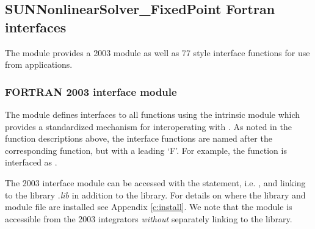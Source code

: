 \subsection{SUNNonlinearSolver\_FixedPoint Fortran interfaces}
\label{ss:sunnonlinsolfixedpoint_fortran}

The {\sunnonlinsolfixedpoint} module provides a {\F} 2003 module as well as
{\F} 77 style interface functions for use from {\F} applications.

\subsubsection*{FORTRAN 2003 interface module}
The  {\F} module defines interfaces to all \newline
{\sunnonlinsolfixedpoint} {\CC} functions using the intrinsic 
module which provides a standardized mechanism for interoperating with {\CC}. As
noted in the {\CC} function descriptions above, the interface functions are
named after the corresponding {\CC} function, but with a leading `F'. For
example, the function  is interfaced as
.

The {\F} 2003 {\sunnonlinsolfixedpoint} interface module can be accessed with the 
statement, i.e. , and linking to the
library \newline
{}.{\em lib} in addition to the
{\CC} library. For details on where the library and module file
 are installed see Appendix \ref{c:install}.
We note that the module is accessible from the {\F} 2003 {\sundials} integrators
\textit{without} separately linking to the
 library.

